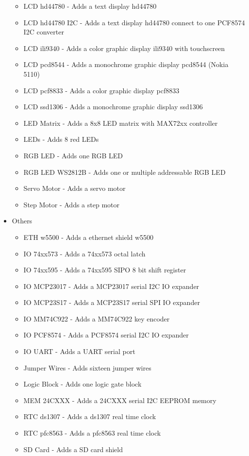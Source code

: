 \begin{itemize}
\begin{itemize}
   \item LCD hd44780 - Adds a text display hd44780
   \item LCD hd44780 I2C - Adds a text display hd44780 connect to one PCF8574 I2C converter
   \item LCD ili9340 - Adds a color graphic display ili9340 with touchscreen 
   \item LCD pcd8544 - Adds a monochrome graphic display pcd8544 (Nokia 5110)
   \item LCD pcf8833 - Adds a color graphic display pcf8833
   \item LCD ssd1306 - Adds a monochrome graphic display ssd1306
   \item LED Matrix - Adds a 8x8 LED matrix with MAX72xx controller 
   \item LEDs - Adds 8 red LEDs
   \item RGB LED - Adds one RGB LED 
   \item RGB LED WS2812B - Adds one or multiple addressable RGB LED 
   \item Servo Motor - Adds a servo motor
   \item Step Motor - Adds a step motor
 \end{itemize}
 \item{Others}
  \begin{itemize}
   \item ETH w5500 - Adds a ethernet shield w5500
   \item IO 74xx573 - Adds a 74xx573 octal latch
   \item IO 74xx595 - Adds a 74xx595 SIPO 8 bit shift register
   \item IO MCP23017 - Adds a MCP23017 serial I2C IO expander
   \item IO MCP23S17 - Adds a MCP23S17 serial SPI IO expander
   \item IO MM74C922 - Adds a MM74C922 key encoder
   \item IO PCF8574 - Adds a PCF8574 serial I2C IO expander
   \item IO UART - Adds a UART serial port 
   \item Jumper Wires - Adds sixteen jumper wires 
   \item Logic Block - Adds one logic gate block
   \item MEM 24CXXX - Adds a 24CXXX serial I2C EEPROM  memory
   \item RTC ds1307 - Adds a ds1307 real time clock 
   \item RTC pfc8563 - Adds a pfc8563 real time clock
   \item SD Card - Adds a SD card shield

\end{itemize}
\end{itemize}
